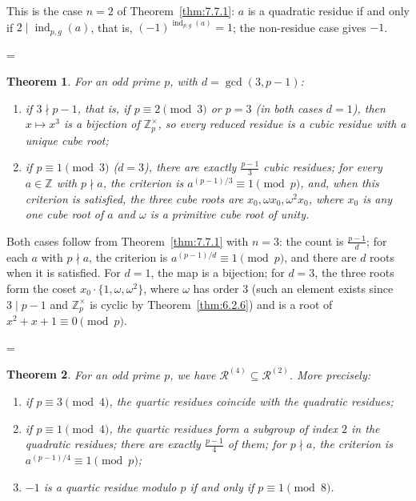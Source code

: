 \documentclass[11pt]{article}
\makeatletter
\theoremstyle{ntstyle}
\newtheorem{theorem}{Theorem}[subsection]
\let\nt@closedisplay\]
\def\nt@guardedclose{\@ifnextchar\par{\nt@closeafterpar}{\@ifnextchar\end{\postdisplaypenalty\@M\nt@closedisplay}{\nt@closedisplay}}}
\def\nt@closeafterpar\par{\@ifnextchar\par{\nt@closeafterpar}{\@ifnextchar\end{\postdisplaypenalty\@M\nt@closedisplay\par}{\nt@closedisplay\par}}}
\renewenvironment{proof}[1][\proofname]{\par
  \pushQED{\qed}\normalfont\topsep\medskipamount\edef\nt@afterproof{\@endparpenalty=\the\@endparpenalty\relax}\@beginparpenalty\@M\@endparpenalty\@M\let\]\nt@guardedclose\trivlist\item[]\textit{#1\@addpunct{.}} \ignorespaces}{\ifvmode\addpenalty\@M\fi\popQED\nt@afterproof\endtrivlist\@endpefalse}
\newcommand{\ZmodUnits}[1]{\mathbb{Z}_{#1}^{\times}}
\DeclareMathOperator{\ind}{ind}
\makeatother
\begin{document}
\begin{proof} This is the case $n = 2$ of Theorem~\ref{thm:7.7.1}:
	$a$ is a quadratic residue if and only if $2 \mid \ind_{p,g}(a)$,
	that is, $(-1)^{\ind_{p,g}(a)} = 1$; the non-residue case
	gives $-1$.

\end{proof}
\begin{theorem}\label{thm:7.7.5} For an odd prime
	$p$, with $d = \gcd(3, p-1)$:

	\begin{enumerate}[label={\alph*)}]
		\item if $3 \nmid p - 1$, that is, if $p \equiv 2 \pmod{3}$ or $p = 3$
		      (in both cases $d = 1$), then $x \mapsto x^{3}$ is a bijection of
		      $\ZmodUnits{p}$, so every reduced residue is a cubic residue
		      with a unique cube root;
		\item if $p \equiv 1 \pmod{3}$ ($d = 3$), there are exactly
		      $\frac{p-1}{3}$ cubic residues; for every $a\in\mathbb{Z}$ with
		      $p\nmid a$, the criterion is $a^{(p-1)/3} \equiv 1\pmod{p}$,
		      and, when this criterion is satisfied, the three cube roots are $x_0, \omega x_0,
		      \omega^{2} x_0$, where $x_0$ is any one cube root of $a$ and $\omega$ is a primitive cube root of unity.
	\end{enumerate}

\end{theorem}

\begin{proof} Both cases follow from Theorem~\ref{thm:7.7.1} with $n = 3$:
	the count is $\frac{p-1}{d}$; for each $a$ with $p\nmid a$, the criterion
	is $a^{(p-1)/d} \equiv 1 \pmod{p}$, and there are $d$ roots when it is
	satisfied. For $d = 1$, the map is a bijection; for
	$d = 3$, the three roots form the coset $x_0 \cdot \{1, \omega,
		\omega^{2}\}$, where $\omega$ has order $3$ (such an element exists since $3 \mid p-1$ and $\ZmodUnits{p}$ is cyclic by Theorem~\ref{thm:6.2.6}) and is a root of $x^{2} + x + 1 \equiv 0 \pmod{p}$.

\end{proof}
\begin{theorem}\label{thm:7.7.6} For an odd prime $p$,
	we have $\mathcal{R}^{(4)}\subseteq\mathcal{R}^{(2)}$. More precisely:

	\begin{enumerate}[label={\alph*)}]
		\item if $p \equiv 3 \pmod{4}$, the quartic residues
		      coincide with the quadratic residues;
		\item if $p \equiv 1 \pmod{4}$, the quartic residues form a
		      subgroup of index $2$ in the quadratic residues; there are exactly
		      $\frac{p-1}{4}$ of them; for $p\nmid a$, the criterion is
		      $a^{(p-1)/4} \equiv 1 \pmod{p}$;
		\item $-1$ is a quartic residue modulo $p$ if and only if
		      $p\equiv1\pmod8$.
	\end{enumerate}

\end{theorem}
\end{document}
